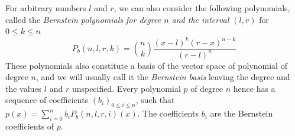 \documentclass{mscs}
\begin{document}

For arbitrary numbers \(l\) and
\(r\), we can also consider the following polynomials, called
the {\em Bernstein polynomials for degree \(n\) and the interval
\((l,r)\)} for \(0 \leq k \leq n\)
\[P_b(n, l, r, k) = \binom{n}{k} \frac{(x-l)^{k}(r-x)^{n - k}}{(r-l)^n}\]
These polynomials also constitute a basis of the vector space of polynomial
of degree \(n\), and we will usually call it the {\em Bernstein basis} leaving
the degree and the values \(l\) and \(r\) unspecified.
Every polynomial \(p\) of degree \(n\) hence has a sequence of coefficients
\((b_i)_{0\leq i \leq n}\), such that \(p(x) = \sum_{i=0}^n b_i P_b(n,l,r,i)(x)\).  The coefficients
\(b_i\) are the Bernstein coefficients of $p$.
\end{document}
